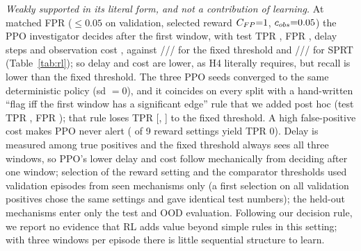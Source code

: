 \emph{Weakly supported in its literal form, and not a contribution of learning.} At matched FPR ($\le0.05$ on validation, selected reward $C_{FP}{=}1$, $c_{obs}{=}0.05$) the PPO investigator decides after the first window, with test TPR \rlPpotesttpr{}, FPR \rlPpotestfpr{}, delay \rlPpotestdelay{} steps and observation cost \rlPpotestcost{}, against \rlThrtesttpr{}/\rlThrtestfpr{}/\rlThrtestdelay{}/\rlThrtestcost{} for the fixed threshold and \rlSprttesttpr{}/\rlSprttestfpr{}/\rlSprttestdelay{}/\rlSprttestcost{} for SPRT (Table~\ref{tab:rl}); so delay and cost are lower, as H4 literally requires, but recall is lower than the fixed threshold. The three PPO seeds converged to the same deterministic policy (sd $=0$), and it coincides on every split with a hand-written ``flag iff the first window has a significant edge'' rule that we added post hoc (test TPR \rlFwtesttpr{}, FPR \rlFwtestfpr{}); that rule loses \rlFwDiff{} TPR [\rlFwDiffLo, \rlFwDiffHi] to the fixed threshold. A high false-positive cost makes PPO never alert (\rlNeverAlertCfgs{} of 9 reward settings yield TPR 0). Delay is measured among true positives and the fixed threshold always sees all three windows, so PPO's lower delay and cost follow mechanically from deciding after one window; selection of the reward setting and the comparator thresholds used validation episodes from seen mechanisms only (a first selection on all validation positives chose the same settings and gave identical test numbers); the held-out mechanisms enter only the test and OOD evaluation. Following our decision rule, we report no evidence that RL adds value beyond simple rules in this setting; with three windows per episode there is little sequential structure to learn.
\begin{table}[t]\centering\small\caption{Investigators on test episodes at matched FPR $\le 0.05$ (thresholds and rewards selected on validation). Delay is the time step of the last window seen at alert; cost counts observe steps plus $2.5\times$ inspections.}\label{tab:rl}\end{table}
